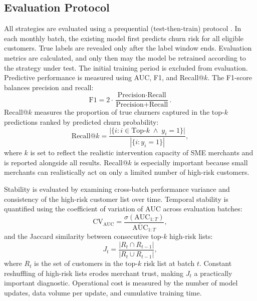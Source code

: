 \subsection{Evaluation Protocol}

All strategies are evaluated using a prequential (test-then-train) protocol \cite{dawid1984, gama2013}. In each monthly batch, the existing model first predicts churn risk for all eligible customers. True labels are revealed only after the label window ends. Evaluation metrics are calculated, and only then may the model be retrained according to the strategy under test. The initial training period is excluded from evaluation. Predictive performance is measured using AUC, F1, and Recall@$k$. The F1-score balances precision and recall:
\begin{equation}
  \text{F1} = 2 \cdot \frac{\text{Precision} \cdot \text{Recall}}{\text{Precision} + \text{Recall}}.
  \label{eq:f1}
\end{equation}
Recall@$k$ measures the proportion of true churners captured in the top-$k$ predictions ranked by predicted churn probability:
\begin{equation}
  \text{Recall@}k = \frac{\bigl|\{i : i \in \text{Top-}k \;\land\; y_i = 1\}\bigr|}{|\{i : y_i = 1\}|},
  \label{eq:recall-at-k}
\end{equation}
where $k$ is set to reflect the realistic intervention capacity of SME merchants and is reported alongside all results. Recall@$k$ is especially important because small merchants can realistically act on only a limited number of high-risk customers.

Stability is evaluated by examining cross-batch performance variance and consistency of the high-risk customer list over time. Temporal stability is quantified using the coefficient of variation of AUC across evaluation batches:
\begin{equation}
  \text{CV}_{\text{AUC}} = \frac{\sigma(\text{AUC}_{1:T})}{\overline{\text{AUC}}_{1:T}},
  \label{eq:cv-auc}
\end{equation}
and the Jaccard similarity between consecutive top-$k$ high-risk lists:
\begin{equation}
  J_t = \frac{|R_t \cap R_{t-1}|}{|R_t \cup R_{t-1}|},
  \label{eq:jaccard}
\end{equation}
where $R_t$ is the set of customers in the top-$k$ risk list at batch $t$. Constant reshuffling of high-risk lists erodes merchant trust, making $J_t$ a practically important diagnostic. Operational cost is measured by the number of model updates, data volume per update, and cumulative training time.

